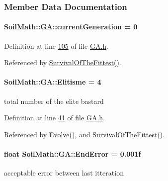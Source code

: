 \subsubsection{Member Data Documentation}
\hypertarget{class_soil_math_1_1_g_a_ad1d08c52d5160714a997bcd30de028e3}{}
\paragraph[{current\+Generation}]{ Soil\+Math\+::\+G\+A\+::current\+Generation = 0\hspace{0.3cm}{\ttfamily [private]}}\label{class_soil_math_1_1_g_a_ad1d08c52d5160714a997bcd30de028e3}


Definition at line \hyperlink{_g_a_8h_source_l00105}{105} of file \hyperlink{_g_a_8h_source}{G\+A.\+h}.



Referenced by \hyperlink{_g_a_8cpp_source_l00189}{Survival\+Of\+The\+Fittest()}.

\hypertarget{class_soil_math_1_1_g_a_a381e62f146aacfa86fec6e0dc40053ab}{}
\paragraph[{Elitisme}]{ Soil\+Math\+::\+G\+A\+::\+Elitisme = 4}\label{class_soil_math_1_1_g_a_a381e62f146aacfa86fec6e0dc40053ab}
total number of the elite bastard 

Definition at line \hyperlink{_g_a_8h_source_l00041}{41} of file \hyperlink{_g_a_8h_source}{G\+A.\+h}.



Referenced by \hyperlink{_g_a_8cpp_source_l00023}{Evolve()}, and \hyperlink{_g_a_8cpp_source_l00189}{Survival\+Of\+The\+Fittest()}.

\hypertarget{class_soil_math_1_1_g_a_ad5d1226dba5df72a3419e9af62f4e9d9}{}
\paragraph[{End\+Error}]{\setlength{\rightskip}{0pt plus 5cm}float Soil\+Math\+::\+G\+A\+::\+End\+Error = 0.\+001f}\label{class_soil_math_1_1_g_a_ad5d1226dba5df72a3419e9af62f4e9d9}
acceptable error between last itteration 

